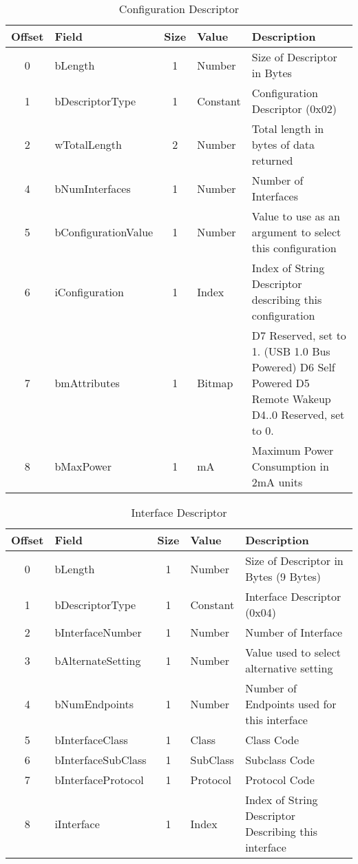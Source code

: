 \begin{appendices}
\begin{table}[h]
\centering
\label{tab:usb_configuration_descriptor}
\begin{tabular}{|c|l|c|l|p{8cm}|}
\hline
\textbf{Offset} & \textbf{Field} & \textbf{Size} & \textbf{Value} & \textbf{Description} \\ \hline
0 & bLength & 1 & Number & Size of Descriptor in Bytes \\ \hline
1 & bDescriptorType & 1 & Constant & Configuration Descriptor (0x02) \\ \hline
2 & wTotalLength & 2 & Number & Total length in bytes of data returned \\ \hline
4 & bNumInterfaces & 1 & Number & Number of Interfaces \\ \hline
5 & bConfigurationValue & 1 & Number & Value to use as an argument to select this configuration \\ \hline
6 & iConfiguration & 1 & Index & Index of String Descriptor describing this configuration \\ \hline
7 & bmAttributes & 1 & Bitmap & D7 Reserved, set to 1. (USB 1.0 Bus Powered) D6 Self Powered D5 Remote Wakeup D4..0 Reserved, set to 0. \\ \hline
8 & bMaxPower & 1 & mA & Maximum Power Consumption in 2mA units \\ \hline
\end{tabular}
\caption{Configuration Descriptor}
\end{table}

\begin{table}[h]
\centering
\label{tab:usb_interface_descriptor}
\begin{tabular}{|c|l|c|l|p{6cm}|}
\hline
\textbf{Offset} & \textbf{Field} & \textbf{Size} & \textbf{Value} & \textbf{Description} \\ \hline
0 & bLength & 1 & Number & Size of Descriptor in Bytes (9 Bytes) \\ \hline
1 & bDescriptorType & 1 & Constant & Interface Descriptor (0x04) \\ \hline
2 & bInterfaceNumber & 1 & Number & Number of Interface \\ \hline
3 & bAlternateSetting & 1 & Number & Value used to select alternative setting \\ \hline
4 & bNumEndpoints & 1 & Number & Number of Endpoints used for this interface \\ \hline
5 & bInterfaceClass & 1 & Class & Class Code \\ \hline
6 & bInterfaceSubClass & 1 & SubClass & Subclass Code \\ \hline
7 & bInterfaceProtocol & 1 & Protocol & Protocol Code \\ \hline
8 & iInterface & 1 & Index & Index of String Descriptor Describing this interface \\ \hline
\end{tabular}
\caption{Interface Descriptor}
\end{table}


\end{appendices}
